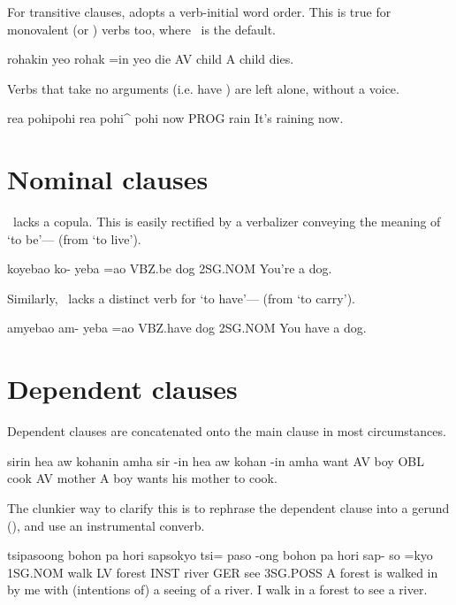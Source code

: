 For transitive clauses, \langname{} adopts a verb-initial word order.
This is true for monovalent (or ) verbs too, where \AV~is the default.
\begin{examples}
	\ex
	\label{ex:the_child_dies}
	\script rohakin yeo
	\bits rohak =in yeo
	\gloss die AV child
	\tr A child dies.
\end{examples}

Verbs that take no arguments (i.e. have ) are left alone, without a voice.
\begin{examples}
	\ex
	\label{ex:its_raining}
	\script rea pohipohi
	\bits rea pohi^ pohi
	\gloss now PROG rain
	\tr It's raining now.
\end{examples}

\section{Nominal clauses}
\langname~lacks a copula. This is easily rectified by a verbalizer conveying the meaning of `to be'--- (from  `to live').
\begin{examples}
	\ex
	\label{ex:you_bitch}
	\script koyebao
	\bits ko- yeba =ao
	\gloss VBZ.be dog 2SG.NOM
	\tr You're a dog.
\end{examples}

Similarly, \langname~lacks a distinct verb for `to have'--- (from  `to carry').
\begin{examples}
	\ex
	\label{ex:you_have_a_dog}
	\script amyebao
	\bits am- yeba =ao
	\gloss VBZ.have dog 2SG.NOM
	\tr You have a dog.
\end{examples}

\section{Dependent clauses}
Dependent clauses are concatenated onto the main clause in most circumstances.
\begin{examples}
	\ex
	\label{ex:boy_want_mom_cook}
	\script sirin hea aw kohanin amha
	\bits sir -in hea aw kohan -in amha
	\gloss want AV boy OBL cook AV mother
	\tr A boy wants his mother to cook.
\end{examples}
The clunkier way to clarify this is to rephrase the dependent clause into a gerund (\GER), and use an instrumental converb.
\begin{examples}
	\ex
	\label{ex:go_forest_to_see_river}
	\script tsipasoong bohon pa hori sapsokyo
	\bits tsi= paso -ong bohon pa hori sap- so =kyo
	\gloss 1SG.NOM walk LV forest INST river GER see 3SG.POSS
	\tr A forest is walked in by me with (intentions of) a seeing of a river.
	\tr I walk in a forest to see a river.
\end{examples}


